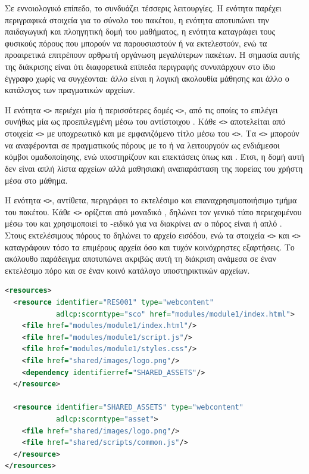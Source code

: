 Σε εννοιολογικό επίπεδο, το  συνδυάζει τέσσερις λειτουργίες. Η ενότητα  παρέχει περιγραφικά στοιχεία για το σύνολο του πακέτου, η ενότητα  αποτυπώνει την παιδαγωγική και πλοηγητική δομή του μαθήματος, η ενότητα  καταγράφει τους φυσικούς πόρους που μπορούν να παρουσιαστούν ή να εκτελεστούν, ενώ τα προαιρετικά  επιτρέπουν αρθρωτή οργάνωση μεγαλύτερων πακέτων. Η σημασία αυτής της διάκρισης είναι ότι διαφορετικά επίπεδα περιγραφής συνυπάρχουν στο ίδιο έγγραφο χωρίς να συγχέονται: άλλο είναι η λογική ακολουθία μάθησης και άλλο ο κατάλογος των πραγματικών αρχείων.

Η ενότητα \texttt{<>} περιέχει μία ή περισσότερες δομές \texttt{<>}, από τις οποίες το  επιλέγει συνήθως μία ως προεπιλεγμένη μέσω του αντίστοιχου . Κάθε \texttt{<>} αποτελείται από στοιχεία \texttt{<>} με υποχρεωτικό \texttt{} και με εμφανιζόμενο τίτλο μέσω του \texttt{<>}. Τα \texttt{<>} μπορούν να αναφέρονται σε πραγματικούς πόρους με το \texttt{} ή να λειτουργούν ως ενδιάμεσοι κόμβοι ομαδοποίησης, ενώ υποστηρίζουν και  επεκτάσεις όπως \texttt{} και \texttt{}. Έτσι, η δομή αυτή δεν είναι απλή λίστα αρχείων αλλά μαθησιακή αναπαράσταση της πορείας του χρήστη μέσα στο μάθημα.

Η ενότητα \texttt{<>}, αντίθετα, περιγράφει το εκτελέσιμο και επαναχρησιμοποιήσιμο τμήμα του πακέτου. Κάθε \texttt{<>} ορίζεται από μοναδικό \texttt{}, δηλώνει τον γενικό τύπο περιεχομένου μέσω του \texttt{} και χρησιμοποιεί το -ειδικό \texttt{} για να διακρίνει αν ο πόρος είναι  ή απλό . Στους εκτελέσιμους πόρους το \texttt{} δηλώνει το αρχείο εισόδου, ενώ τα στοιχεία \texttt{<>} και \texttt{<>} καταγράφουν τόσο τα επιμέρους αρχεία όσο και τυχόν κοινόχρηστες εξαρτήσεις. Το ακόλουθο παράδειγμα αποτυπώνει ακριβώς αυτή τη διάκριση ανάμεσα σε έναν εκτελέσιμο πόρο και σε έναν κοινό κατάλογο υποστηρικτικών αρχείων.

{\selectfont
\begin{lstlisting}[language=XML, caption={Παράδειγμα \ENG{SCORM} 1.2 \ENG{Resources} \ENG{Section}}, label={lst:scorm12_resources}]
<resources>
  <resource identifier="RES001" type="webcontent" 
            adlcp:scormtype="sco" href="modules/module1/index.html">
    <file href="modules/module1/index.html"/>
    <file href="modules/module1/script.js"/>
    <file href="modules/module1/styles.css"/>
    <file href="shared/images/logo.png"/>
    <dependency identifierref="SHARED_ASSETS"/>
  </resource>
  
  <resource identifier="SHARED_ASSETS" type="webcontent"
            adlcp:scormtype="asset">
    <file href="shared/images/logo.png"/>
    <file href="shared/scripts/common.js"/>
  </resource>
</resources>
\end{lstlisting}
}

